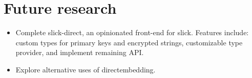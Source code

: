 \section{Future research} %
\label{sec:Future_research}
\begin{itemize}
    \item Complete slick-direct, an opinionated front-end for slick. Features include: custom types for primary keys and encrypted strings, customizable type provider, and implement remaining API.
    \item Explore alternative uses of directembedding.
\end{itemize}

